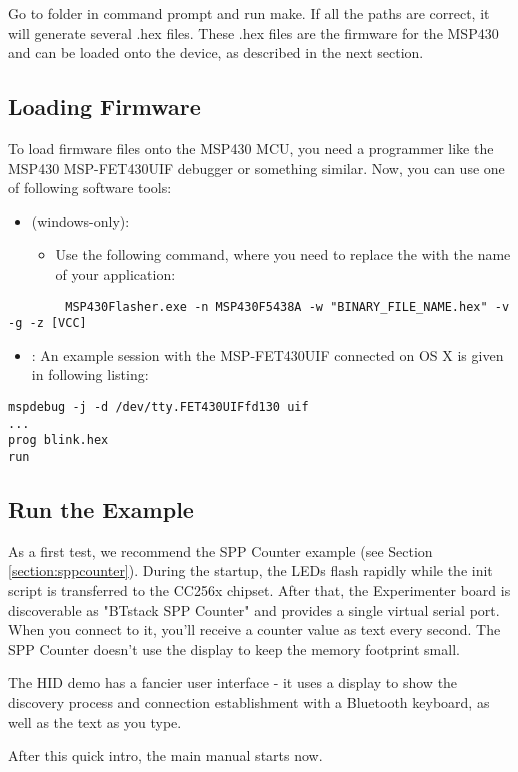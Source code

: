 Go to  folder in command prompt and run make. If all the paths are correct, it will generate several .hex files. These .hex files are the firmware for the MSP430 and can be loaded onto the device, as described in the next section.

\subsection{Loading Firmware}

To load firmware files onto the MSP430 MCU, you need a programmer like the MSP430 MSP-FET430UIF debugger or something similar. Now, you can use one of following software tools:

 \begin{itemize}
 \item  \MSPFlasher{} (windows-only):
 	\begin{itemize}
 	   \item Use the following command, where you need to replace the  with the name of your application:
	\end{itemize} 
\end{itemize}
	
	   \begin{lstlisting}
 		MSP430Flasher.exe -n MSP430F5438A -w "BINARY_FILE_NAME.hex" -v -g -z [VCC]
	   \end{lstlisting}

 \begin{itemize}
	
	\item \MSPDebug{}: An example session with the MSP-FET430UIF connected on OS X is given in following listing:
\end{itemize}

\begin{lstlisting}
mspdebug -j -d /dev/tty.FET430UIFfd130 uif
... 
prog blink.hex
run
\end{lstlisting}


\subsection{Run the Example}

As a first test, we recommend the SPP Counter example (see Section \ref{section:sppcounter}). During the startup, the LEDs flash rapidly while the init script is transferred to the CC256x chipset. After that, the Experimenter board is discoverable as "BTstack SPP Counter" and provides a single virtual serial port. When you connect to it, you'll receive a counter value as text every second. The SPP Counter doesn't use the display to keep the memory footprint small.

The HID demo has a fancier user interface - it uses a display to show the discovery process and connection establishment with a Bluetooth keyboard, as well as the text as you type.

After this quick intro, the main manual starts now.

 

